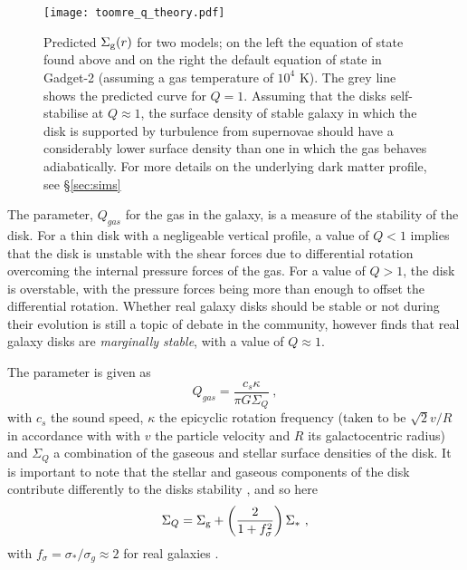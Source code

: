 \begin{figure}[ht]
    \centering
    \texttt{[image: toomre\_q\_theory.pdf]}
    \caption{Predicted $\Sigma_\mathrm{g}(r)$ for two models; on the left the equation of state found above and on the right the default equation of state in Gadget-2 (assuming a gas temperature of $10^4$ K). The grey line shows the predicted curve for $Q=1$. Assuming that the disks self-stabilise at $Q\approx1$, the surface density of stable galaxy in which the disk is supported by turbulence from supernovae should have a considerably lower surface density than one in which the gas behaves adiabatically. For more details on the underlying dark matter profile, see \S \ref{sec:sims}}
    \label{fig:toomreqthr}
\end{figure}

The \citet{toomre_gravitational_1964} parameter, $Q_{gas}$ for the gas in the galaxy, is a measure of the stability of the disk.
For a thin disk with a negligeable vertical profile, a value of $Q<1$ implies that the disk is unstable with the shear forces due to differential rotation overcoming the internal pressure forces of the gas.
For a value of $Q>1$, the disk is overstable, with the pressure forces being more than enough to offset the differential rotation.
Whether real galaxy disks should be stable or not during their evolution is still a topic of debate in the community, however \citet{hopkins_stellar_2012} finds that real galaxy disks are \emph{marginally stable}, with a value of $Q \approx 1$.

The \citet{toomre_gravitational_1964} parameter is given as
\begin{equation}
    Q_{gas} = \frac{c_s \kappa}{\pi G \Sigma_Q}~,
    \label{eqn:Q}
\end{equation}
with $c_s$ the sound speed, $\kappa$ the epicyclic rotation frequency (taken to be $\sqrt{2} v/R$ in accordance with \citet{livermore_resolved_2015} with $v$ the particle velocity and $R$ its galactocentric radius) and $\Sigma_Q$ a combination of the gaseous and stellar surface densities of the disk.
It is important to note that the stellar and gaseous components of the disk contribute differently to the disks stability \citep{rafikov_local_2001}, and so here
\begin{equation}
    \Sigma_Q = \Sigma_\mathrm{g}  + \left(\frac{2}{1 + f_\sigma^2}\right)\Sigma_*~,
    \label{eqn:sgq}
\end{equation}
with $f_\sigma = \sigma_*/\sigma_g \approx 2$ for real galaxies \citep{korchagin_local_2003}.

